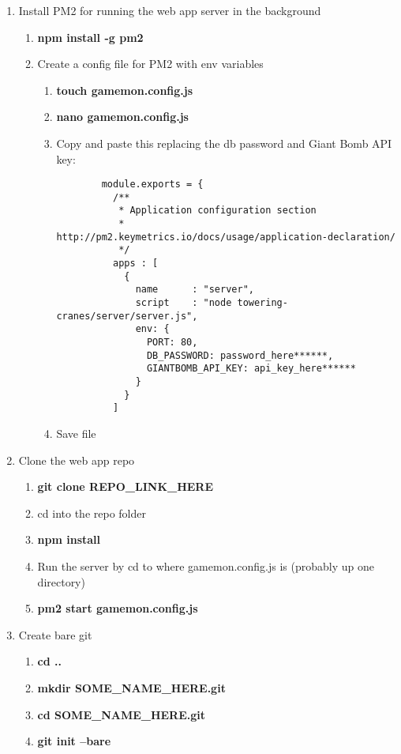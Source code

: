 \documentclass{article}
\begin{document}
\begin{enumerate}
\begin{enumerate}
    \item Install PM2 for running the web app server in the background
    \begin{enumerate}
      \item \textbf{npm install -g pm2}
      \item Create a config file for PM2 with env variables
      \begin{enumerate}
        \item \textbf{touch gamemon.config.js}
        \item \textbf{nano gamemon.config.js}
        \item Copy and paste this replacing the db password and Giant Bomb API key:
        \begin{lstlisting}
        module.exports = {
          /**
           * Application configuration section
           * http://pm2.keymetrics.io/docs/usage/application-declaration/
           */
          apps : [
            {
              name      : "server",
              script    : "node towering-cranes/server/server.js",
              env: {
                PORT: 80,
                DB_PASSWORD: password_here******,
                GIANTBOMB_API_KEY: api_key_here******
              }
            }
          ]
        \end{lstlisting}
        \item Save file
      \end{enumerate}
    \end{enumerate}
    \item Clone the web app repo
    \begin{enumerate}
      \item \textbf{git clone REPO\_LINK\_HERE}
      \item cd into the repo folder
      \item \textbf{npm install}
      \item Run the server by cd to where gamemon.config.js is (probably up one directory)
      \item \textbf{pm2 start gamemon.config.js}
    \end{enumerate}
    \item Create bare git
    \begin{enumerate}
      \item \textbf{cd ..}
      \item \textbf{mkdir SOME\_NAME\_HERE.git}
      \item \textbf{cd SOME\_NAME\_HERE.git}
      \item \textbf{git init --bare}

\end{enumerate}
\end{enumerate}
\end{enumerate}
\end{document}
